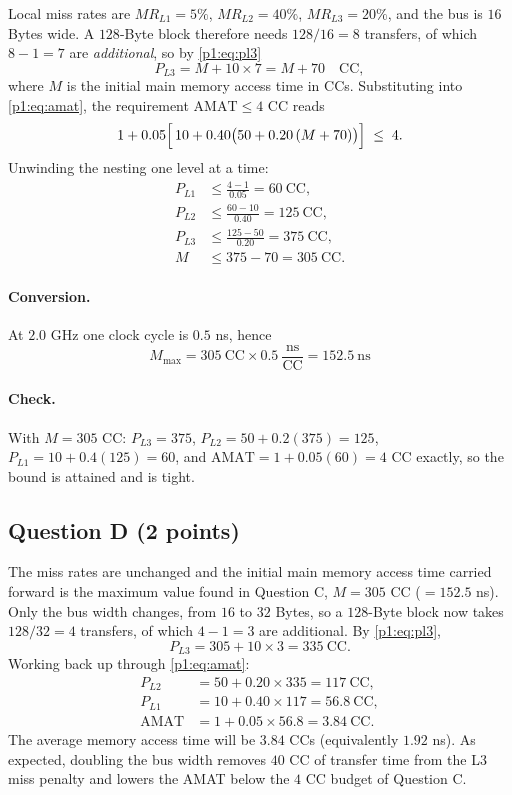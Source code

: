 Local miss rates are $MR_{L1}=5\%$, $MR_{L2}=40\%$, $MR_{L3}=20\%$, and the bus is
$16$ Bytes wide. A $128$-Byte block therefore needs $128/16=8$ transfers, of which
$8-1=7$ are \emph{additional}, so by \eqref{p1:eq:pl3}
\[
  P_{L3}=M+10\times 7=M+70 \quad\text{CC},
\]
where $M$ is the initial main memory access time in CCs. Substituting into
\eqref{p1:eq:amat}, the requirement $\mathrm{AMAT}\le 4$ CC reads
\[
  1+0.05\Bigl[\,10+0.40\bigl(50+0.20\,(M+70)\bigr)\Bigr]\;\le\;4 .
\]
Unwinding the nesting one level at a time:
\begin{align*}
  P_{L1}&\le\frac{4-1}{0.05}=60\ \text{CC},\\[2pt]
  P_{L2}&\le\frac{60-10}{0.40}=125\ \text{CC},\\[2pt]
  P_{L3}&\le\frac{125-50}{0.20}=375\ \text{CC},\\[2pt]
  M&\le 375-70=305\ \text{CC}.
\end{align*}

\paragraph{Conversion.}
At $2.0$ GHz one clock cycle is $0.5$ ns, hence
\[
  \boxed{\,M_{\max}=305\ \mathrm{CC}\times 0.5\ \frac{\mathrm{ns}}{\mathrm{CC}}=152.5\ \mathrm{ns}\,}
\]

\paragraph{Check.}
With $M=305$ CC: $P_{L3}=375$, $P_{L2}=50+0.2(375)=125$, $P_{L1}=10+0.4(125)=60$, and
$\mathrm{AMAT}=1+0.05(60)=4$ CC exactly, so the bound is attained and is tight.

\subsection*{Question D (2 points)}

The miss rates are unchanged and the initial main memory access time carried forward is
the maximum value found in Question C, $M=305$ CC ($=152.5$ ns). Only the bus width
changes, from $16$ to $32$ Bytes, so a $128$-Byte block now takes $128/32=4$ transfers,
of which $4-1=3$ are additional. By \eqref{p1:eq:pl3},
\[
  P_{L3}=305+10\times 3=335\ \text{CC}.
\]
Working back up through \eqref{p1:eq:amat}:
\begin{align*}
  P_{L2}&=50+0.20\times 335=117\ \text{CC},\\
  P_{L1}&=10+0.40\times 117=56.8\ \text{CC},\\
  \mathrm{AMAT}&=1+0.05\times 56.8=3.84\ \text{CC}.
\end{align*}
The average memory access time will be $\boxed{3.84}$ CCs (equivalently $1.92$ ns).
As expected, doubling the bus width removes $40$ CC of transfer time from the L3 miss
penalty and lowers the AMAT below the $4$ CC budget of Question C.
